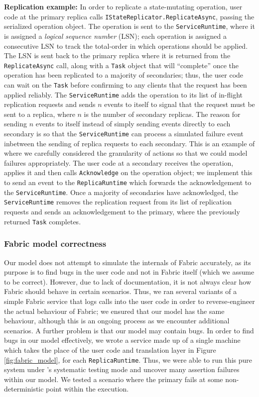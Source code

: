 \textbf{Replication example:} In order to replicate a state-mutating operation,
user code at the primary replica 
calls \texttt{IStateReplicator.ReplicateAsync},
passing the serialized operation
object.
The operation is sent to the \texttt{ServiceRuntime},
where it is assigned a \emph{logical sequence number} (LSN);
each operation is assigned a consecutive LSN
to track the total-order in which operations should be applied.
The LSN is sent back to the primary replica
where it is returned from the \texttt{ReplicateAsync} call,
along with a \texttt{Task} object that will ``complete'' once
the operation has been replicated to a majority of
secondaries;
thus, the user code can wait on the \texttt{Task}
before confirming to any clients that the request has been applied reliably.
The \texttt{ServiceRuntime} adds the operation to its list of in-flight
replication requests and sends $n$ events to itself to signal that the request
must be sent to a replica, where $n$ is the number of secondary replicas.
The reason for sending $n$ events to itself instead of simply sending events
directly to each secondary is so that the \texttt{ServiceRuntime}
can process a simulated failure event inbetween the sending of replica requests
to each secondary.
This is an example of where we carefully considered
the granularity of actions so that we could 
model failures appropriately.
The user code at a secondary receives the operation,
applies it and then calls \texttt{Acknowledge} on the operation object;
we implement this to send an event to the \texttt{ReplicaRuntime}
which forwards the acknowledgement to the \texttt{ServiceRuntime}.
Once a majority of secondaries have acknowledged, the
\texttt{ServiceRuntime} removes the replication request from its list
of replication requests
and sends an acknowledgement to the primary,
where the previously returned \texttt{Task} completes. 

\subsubsection{Fabric model correctness}
Our model does not attempt to
simulate the internals of Fabric accurately,
as its purpose is to find bugs in the user code
and not in Fabric itself (which we assume to be correct).   
However,
due to lack of documentation,
it is not always clear how Fabric should behave
in certain scenarios.
Thus,
we ran several variants of a simple Fabric service
that logs calls into the user code in order to
reverse-engineer the actual behaviour of Fabric;
we ensured that our model has the same behaviour,
although this is an ongoing process as we encounter
additional scenarios.
A further problem is that our model may contain bugs.
In order to find bugs in our model effectively,
we wrote a \psharp{} service made up of a single machine
which takes the place
of the user code and translation layer in Figure \ref{fig:fabric_model},
for each \texttt{ReplicaRuntime}.
Thus, we were able to run this pure \psharp{} system
under \psharp{}'s systematic testing mode
and uncover many assertion failures within our model.
We tested a scenario where the primary fails at some non-deterministic point
within the execution.

